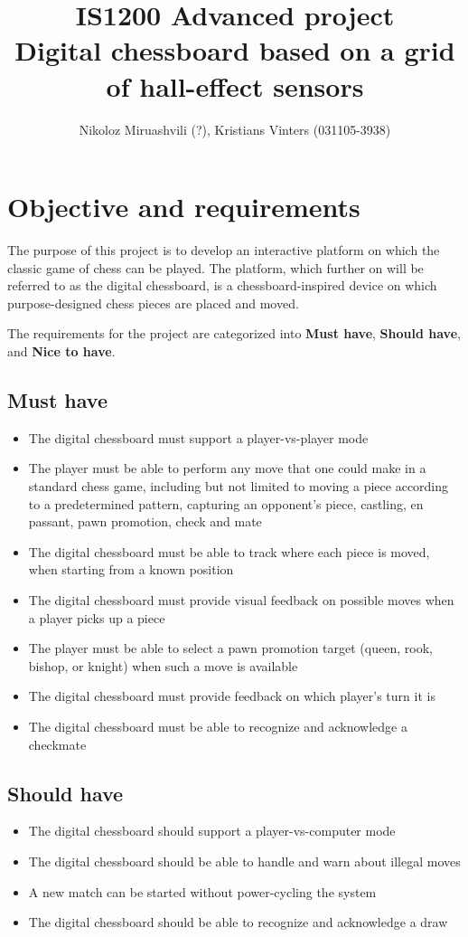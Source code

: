 \documentclass{article}
\title{IS1200 \textbf{Advanced} project\\Digital chessboard based on a grid of hall-effect sensors}
\author{Nikoloz Miruashvili (?), Kristians Vinters (031105-3938)}
\begin{document}
\maketitle

\section{Objective and requirements}

The purpose of this project is to develop an interactive platform on which the classic game of chess can be played. The platform, which further on will be referred to as the digital chessboard, is a chessboard-inspired device on which purpose-designed chess pieces are placed and moved.

The requirements for the project are categorized into \textbf{Must have}, \textbf{Should have}, and \textbf{Nice to have}.

\subsection*{Must have}
\begin{itemize}
	\item The digital chessboard must support a player-vs-player mode
	\item The player must be able to perform any move that one could make in a standard chess game, including but not limited to moving a piece according to a predetermined pattern, capturing an opponent's piece, castling, en passant, pawn promotion, check and mate
	\item The digital chessboard must be able to track where each piece is moved, when starting from a known position
	\item The digital chessboard must provide visual feedback on possible moves when a player picks up a piece
	\item The player must be able to select a pawn promotion target (queen, rook, bishop, or knight) when such a move is available
	\item The digital chessboard must provide feedback on which player's turn it is
	\item The digital chessboard must be able to recognize and acknowledge a checkmate
\end{itemize}

\subsection*{Should have}
\begin{itemize}
	\item The digital chessboard should support a player-vs-computer mode
	\item The digital chessboard should be able to handle and warn about illegal moves
	\item A new match can be started without power-cycling the system
	\item The digital chessboard should be able to recognize and acknowledge a draw
\end{itemize}
\end{document}
